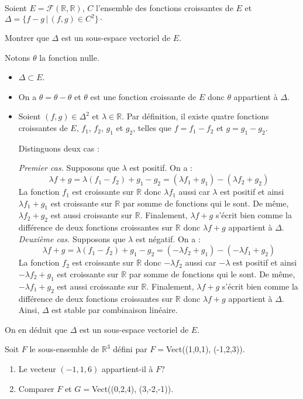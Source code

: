 \documentclass[a4paper,twoside,french,11pt]{VcCours}
\begin{document}
\begin{Exercice}{} Soient $E = \mathcal{F}(\mathbb{R}, \mathbb{R})$, $C$ l'ensemble des fonctions croissantes de $E$ et $\Delta = \lbrace f-g \, \vert \, (f,g) \in C^2 \rbrace\cdot$

Montrer que $\Delta$ est un sous-espace vectoriel de $E$.
\end{Exercice}

\corr Notons $\theta$ la fonction nulle.

\begin{itemize}
\item $\Delta \subset E$.
\item On a $\theta = \theta - \theta$ et $\theta$ est une fonction croissante de $E$ donc $\theta$ appartient à $\Delta$.
\item Soient $(f,g) \in \Delta^2$ et $\lambda \in \mathbb{R}$. Par définition, il existe quatre fonctions croissantes de $E$, $f_1$, $f_2$, $g_1$ et $g_2$, telles que $f=f_1- f_2$ et $g= g_1-g_2$.

\medskip

Distinguons deux cas :

\textit{Premier cas.} Supposons que $\lambda$ est positif. On a :
$$ \lambda f+g = \lambda (f_1-f_2) + g_1- g_2 = (\lambda f_1 + g_1) - (\lambda f_2+g_2)$$
La fonction $f_1$ est croissante sur $\mathbb{R}$ donc $\lambda f_1$ aussi car $\lambda$ est positif et ainsi $\lambda f_1 + g_1$ est croissante sur $\mathbb{R}$ par somme de fonctions qui le sont. De même, $\lambda f_2+g_2$ est aussi croissante sur $\mathbb{R}$. Finalement, $\lambda f+g$ s'écrit bien comme la différence de deux fonctions croissantes sur $\mathbb{R}$ donc $\lambda f+g$ appartient à $\Delta$.
\textit{Deuxième cas.} Supposons que $\lambda$ est négatif. On a :
$$ \lambda f+g = \lambda (f_1-f_2) + g_1- g_2 = (-\lambda f_2 + g_1) - (-\lambda f_1+g_2)$$
La fonction $f_2$ est croissante sur $\mathbb{R}$ donc $-\lambda f_2$ aussi car $-\lambda$ est positif et ainsi $-\lambda f_2 + g_1$ est croissante sur $\mathbb{R}$ par somme de fonctions qui le sont. De même, $-\lambda f_1+g_2$ est aussi croissante sur $\mathbb{R}$. Finalement, $\lambda f+g$ s'écrit bien comme la différence de deux fonctions croissantes sur $\mathbb{R}$ donc $\lambda f+g$ appartient à $\Delta$.
Ainsi, $\Delta$ est stable par combinaison linéaire.
\end{itemize}
On en déduit que $\Delta$ est un sous-espace vectoriel de $E$.

\begin{Exercice}{} Soit $F$ le sous-ensemble de $\mathbb{R}^3$ défini par $F=$Vect((1,0,1), (-1,2,3)). 
\begin{enumerate}
\item Le vecteur $(-1,1,6)$ appartient-il à $F$?
\item Comparer $F$ et $G=$Vect((0,2,4), (3,-2,-1)). 
\end{enumerate}
\end{Exercice}
\end{document}
